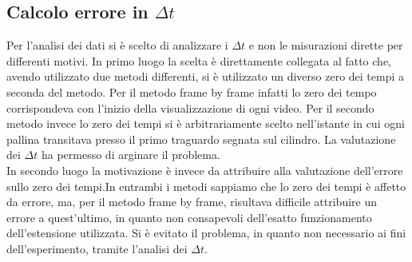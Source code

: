 \documentclass[a4paper,11pt,oneside]{article}
\begin{document}
\subsection{Calcolo errore in $\Delta t$}
Per l'analisi dei dati si è scelto di analizzare i $\Delta t$ e non le misurazioni dirette per differenti motivi. In primo luogo la scelta è direttamente collegata al fatto che, avendo utilizzato due metodi differenti, si è utilizzato un diverso zero dei tempi a seconda del metodo. Per il metodo frame by frame infatti lo zero dei tempo corrispondeva con l'inizio della visualizzazione di ogni video. Per il secondo metodo invece lo zero dei tempi si è arbitrariamente scelto nell'istante in cui ogni pallina transitava presso il primo traguardo segnata sul cilindro. La valutazione dei $\Delta t$ ha permesso di arginare il problema.\\

In secondo luogo la motivazione è invece da attribuire alla valutazione dell'errore sullo zero dei tempi.In entrambi i metodi sappiamo che lo zero dei tempi è affetto da errore, ma, per il metodo frame by frame, risultava difficile attribuire un errore a quest'ultimo, in quanto non consapevoli dell'esatto funzionamento dell'estensione utilizzata. Si è evitato il problema, in quanto non necessario ai fini dell'esperimento, tramite l'analisi dei $\Delta t$.
\end{document}
